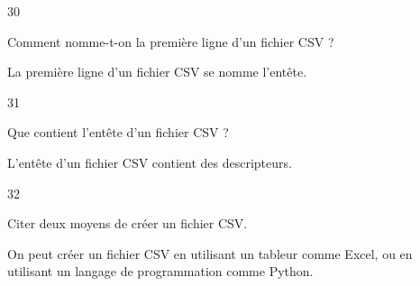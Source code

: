 \begin{taggedblock}{30}
\begin{exoq}
Comment nomme-t-on la première ligne d'un fichier CSV ?
\end{exoq} 
\begin{exor}
La première ligne d'un fichier CSV se nomme l'entête. \bqr
\end{exor} 
\end{taggedblock}

\begin{taggedblock}{31}
\begin{exoq}
Que contient l'entête d'un fichier CSV ?
\end{exoq} 
\begin{exor}
L'entête d'un fichier CSV contient des descripteurs. \bqr
\end{exor} 
\end{taggedblock}

\begin{taggedblock}{32}
\begin{exoq}
Citer deux moyens de créer un fichier CSV.
\end{exoq} 
\begin{exor}
On peut créer un fichier CSV en utilisant un tableur comme Excel, ou en utilisant un langage de programmation comme Python. \bqr
\end{exor} 
\end{taggedblock}
